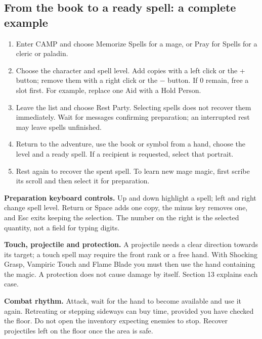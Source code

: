 \subsection*{From the book to a ready spell: a complete example}
\begin{enumerate}
\item Enter CAMP and choose Memorize Spells for a mage, or Pray for Spells for a cleric or paladin.
\item Choose the character and spell level. Add copies with a left click or the + button; remove them with a right click or the $-$ button. If 0 remain, free a slot first. For example, replace one Aid with a Hold Person.
\item Leave the list and choose Rest Party. Selecting spells does not recover them immediately. Wait for messages confirming preparation; an interrupted rest may leave spells unfinished.
\item Return to the adventure, use the book or symbol from a hand, choose the level and a ready spell. If a recipient is requested, select that portrait.
\item Rest again to recover the spent spell. To learn new mage magic, first scribe its scroll and then select it for preparation.
\end{enumerate}

\textbf{Preparation keyboard controls.} Up and down highlight a spell; left and right change spell level. Return or Space adds one copy, the minus key removes one, and Esc exits keeping the selection. The number on the right is the selected quantity, not a field for typing digits.

\textbf{Touch, projectile and protection.} A projectile needs a clear direction towards its target; a touch spell may require the front rank or a free hand. With Shocking Grasp, Vampiric Touch and Flame Blade you must then use the hand containing the magic. A protection does not cause damage by itself. Section 13 explains each case.

\textbf{Combat rhythm.} Attack, wait for the hand to become available and use it again. Retreating or stepping sideways can buy time, provided you have checked the floor. Do not open the inventory expecting enemies to stop. Recover projectiles left on the floor once the area is safe.
